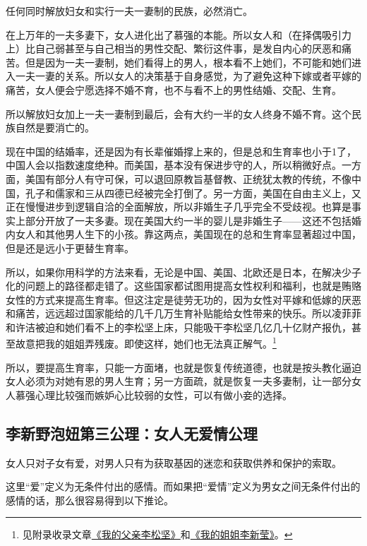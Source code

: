 \begin{theorem}\label{t2}
任何同时解放妇女和实行一夫一妻制的民族，必然消亡。
\end{theorem}

在上万年的一夫多妻下，女人进化出了慕强的本能。所以女人和（在择偶吸引力上）比自己弱甚至与自己相当的男性交配、繁衍这件事，是发自内心的厌恶和痛苦。但是因为一夫一妻制，她们看得上的男人，根本看不上她们，不可能和她们进入一夫一妻的关系。所以女人的决策基于自身感觉，为了避免这种下嫁或者平嫁的痛苦，女人便会宁愿选择不婚不育，也不与看不上的男性结婚、交配、生育。

所以解放妇女加上一夫一妻制到最后，会有大约一半的女人终身不婚不育。这个民族自然是要消亡的。

现在中国的结婚率，还是因为有长辈催婚撑上来的，但是总和生育率也小于1了，中国人会以指数速度绝种。而美国，基本没有保进步守的人，所以稍微好点。一方面，美国有部分人有守可保，可以退回原教旨基督教、正统犹太教的传统，不像中国，孔子和儒家和三从四德已经被完全打倒了。另一方面，美国在自由主义上，又正在慢慢进步到逻辑自洽的全面解放，所以非婚生子几乎完全不受歧视。也算是事实上部分开放了一夫多妻。现在美国大约一半的婴儿是非婚生子——这还不包括婚内女人和其他男人生下的小孩。靠这两点，美国现在的总和生育率显著超过中国，但是还是远小于更替生育率。

所以，如果你用科学的方法来看，无论是中国、美国、北欧还是日本，在解决少子化的问题上的路径都走错了。这些国家都试图用提高女性权利和福利，也就是贿赂女性的方式来提高生育率。但这注定是徒劳无功的，因为女性对平嫁和低嫁的厌恶和痛苦，远远超过国家能给的几千几万生育补贴能给女性带来的快乐。所以凌菲菲和许洁被迫和她们看不上的李松坚上床，只能吸干李松坚几亿几十亿财产报仇，甚至故意把我的姐姐弄残废。即使这样，她们也无法真正解气。\footnote{见附录收录文章\hyperref[3faces]{《我的父亲李松坚》}和\hyperref[sister]{《我的姐姐李新莹》}。}

所以，要提高生育率，只能一方面堵，也就是恢复传统道德，也就是按头教化逼迫女人必须为对她有恩的男人生育；另一方面疏，就是恢复一夫多妻制，让一部分女人慕强心理比较强而嫉妒心比较弱的女性，可以有做小妾的选择。

\subsection{李新野泡妞第三公理：女人无爱情公理}

\begin{axiom}\label{a3}
女人只对子女有爱，对男人只有为获取基因的迷恋和获取供养和保护的索取。
\end{axiom}

这里``爱''定义为无条件付出的感情。而如果把``爱情''定义为男女之间无条件付出的感情的话，那么很容易得到以下推论。


